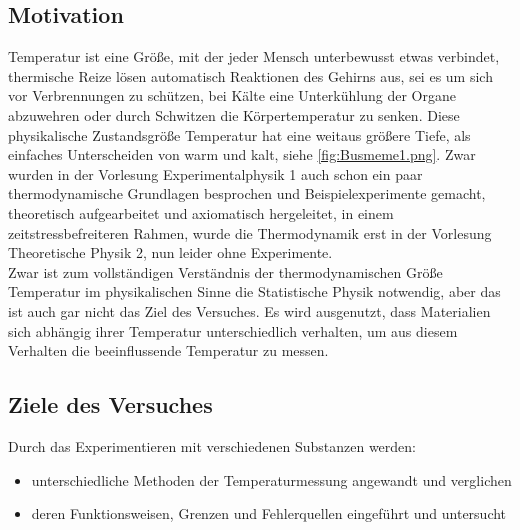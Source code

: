 \subsection{Motivation}
Temperatur ist eine Größe, mit der jeder Mensch unterbewusst etwas verbindet, thermische Reize lösen automatisch Reaktionen des Gehirns aus, sei es um sich vor Verbrennungen zu schützen, bei Kälte eine Unterkühlung der Organe abzuwehren oder durch Schwitzen die Körpertemperatur zu senken. Diese physikalische Zustandsgröße Temperatur hat eine weitaus größere Tiefe, als einfaches Unterscheiden von warm und kalt, siehe \cref{fig:Busmeme1.png}. Zwar wurden in der Vorlesung Experimentalphysik 1 auch schon ein paar thermodynamische Grundlagen besprochen und Beispielexperimente gemacht, theoretisch aufgearbeitet und axiomatisch hergeleitet, in einem zeitstressbefreiteren Rahmen, wurde die Thermodynamik erst in der Vorlesung Theoretische Physik 2, nun leider ohne Experimente. \\
Zwar ist zum vollständigen Verständnis der thermodynamischen Größe Temperatur im physikalischen Sinne die Statistische Physik notwendig, aber das ist auch gar nicht das Ziel des Versuches. Es wird ausgenutzt, dass Materialien sich abhängig ihrer Temperatur unterschiedlich verhalten, um aus diesem Verhalten die beeinflussende Temperatur zu messen.

\subsection{Ziele des Versuches}
Durch das Experimentieren mit verschiedenen Substanzen werden:
\begin{itemize}
    \setlength{\itemsep}{-6pt}
    \item unterschiedliche Methoden der Temperaturmessung angewandt und verglichen
    \item deren Funktionsweisen, Grenzen und Fehlerquellen eingeführt und untersucht  
\end{itemize}

